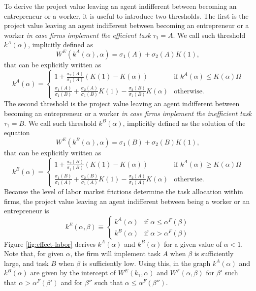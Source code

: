 \documentclass[12pt,american]{paper}
\theoremstyle{remark}
\begin{document}
To derive the project value leaving an agent indifferent between becoming an entrepreneur or a worker, it is useful to introduce two thresholds. The first is the project value leaving an agent indifferent between becoming an entrepreneur or a worker \textit{in case firms implement the efficient task} $\tau_1=A$. We call such threshold $k^A(\alpha)$, implicitly defined as
\[
 W^E(k^A(\alpha),\alpha) = \sigma_1(A) + \sigma_2(A) K(1),
\]
that can be explicitly written as
\[
k^A(\alpha) = \begin{cases}
1+\frac{\sigma_2(A)}{\sigma_1(A)} (K(1)-K(\alpha)) &\mbox{if } k^A(\alpha) \leq K(\alpha) \Omega \\
\frac{\sigma_1(A)}{\sigma_1(B)}+\frac{\sigma_2(A)}{\sigma_1(B)} K(1)-\frac{\sigma_2(B)}{\sigma_1(B)} K(\alpha)  &\mbox{otherwise. } 
\end{cases}
\]
The second threshold is the project value leaving an agent indifferent between becoming an entrepreneur or a worker \textit{in case firms implement the inefficient task} $\tau_1=B$. We call such threshold $k^B(\alpha)$, implicitly defined as the solution of the equation
\[
 W^E(k^B(\alpha),\alpha) = \sigma_1(B) + \sigma_2(B) K(1),
\]
that can be explicitly written as
\[
k^B(\alpha)= \begin{cases}
1+\frac{\sigma_2(B)}{\sigma_1(B)} (K(1)-K(\alpha)) &\mbox{if } k^A(\alpha) \geq K(\alpha) \Omega \\
\frac{\sigma_1(B)}{\sigma_1(A)}+\frac{\sigma_2(B)}{\sigma_1(A)} K(1)-\frac{\sigma_2(A)}{\sigma_1(A)} K(\alpha)  &\mbox{otherwise. } 
\end{cases}
\]
Because the level of labor market frictions determine the task allocation within firms, the project value leaving an agent indifferent between being a worker or an entrepreneur is
\[
k^E (\alpha,\beta)  \equiv 
\begin{cases}
k^A(\alpha) &\mbox{if } \alpha \leq \alpha^F(\beta) \\
k^B(\alpha)  &\mbox{if } \alpha > \alpha^F(\beta)
\end{cases}
\]
Figure \ref{fig:effect-labor} derives $k^A (\alpha)$ and $k^B (\alpha)$ for a given value of $\alpha<1$. Note that, for given $\alpha$, the firm will implement task $A$ when $\beta$ is sufficiently large, and task $B$ when $\beta$ is sufficiently low. Using this, in the graph $k^A (\alpha)$ and $k^B (\alpha)$ are given by the intercept of $W^E(k_1,\alpha)$ and $W^F(\alpha,\beta)$ for $\beta'$ such that $\alpha > \alpha^F(\beta')$ and for $\beta''$ such that $\alpha \leq \alpha^F(\beta'')$.
\end{document}
